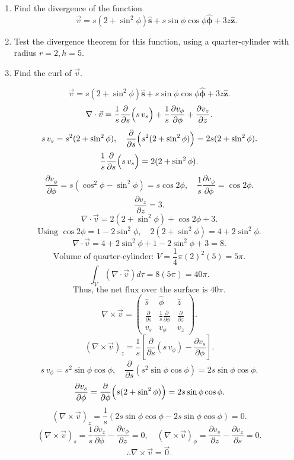 \begin{hwkProblem}{1.43}{}

	\begin{enumerate}
		\item Find the divergence of the function \[ \vec{v} = s \left( 2 + \sin^2{\phi} \right) \mathbf{\hat{s}} + s \sin{\phi} \cos{\phi} \boldsymbol{\hat{\phi}} + 3z \mathbf{\hat{z}} .\]
		\item Test the divergence theorem for this function, using a quarter-cylinder with radius \( r=2, h=5 \).
		\item Find the curl of \( \vec{v} \).
	\end{enumerate}

	\hwkSol

	\hwkPart
	\[
		\vec{v} = s \left( 2 + \sin^2{\phi} \right) \mathbf{\hat{s}} + s \sin{\phi} \cos{\phi} \boldsymbol{\hat{\phi}} + 3z \mathbf{\hat{z}}.
	\]
	\[
		\nabla\cdot\vec{v}=\frac{1}{s}\frac{\partial}{\partial s}\Bigl(s\,v_s\Bigr)
		+\frac{1}{s}\frac{\partial v_\phi}{\partial\phi}+\frac{\partial v_z}{\partial z}.
	\]
	\[
		s\,v_s=s^2(2+\sin^2\phi),\quad \frac{\partial}{\partial s}\Bigl(s^2(2+\sin^2\phi)\Bigr)=2s(2+\sin^2\phi).
	\]
	\[
		\frac{1}{s}\frac{\partial}{\partial s}\Bigl(s\,v_s\Bigr)=2(2+\sin^2\phi).
	\]
	\[
		\frac{\partial v_\phi}{\partial\phi} = s(\cos^2\phi-\sin^2\phi)=s\cos2\phi,\quad \frac{1}{s}\frac{\partial v_\phi}{\partial\phi}=\cos2\phi.
	\]
	\[
		\frac{\partial v_z}{\partial z}=3.
	\]
	\[
		\nabla\cdot\vec{v}=2(2+\sin^2\phi)+\cos2\phi+3.
	\]
	\[
		\text{Using } \cos2\phi=1-2\sin^2\phi,\quad 2(2+\sin^2\phi)=4+2\sin^2\phi.
	\]
	\[
		\nabla\cdot\vec{v}=4+2\sin^2\phi+1-2\sin^2\phi+3=8.
	\]
	\hwkPart
	\[
		\text{Volume of quarter-cylinder: } V=\frac{1}{4}\pi(2)^2(5)=5\pi.
	\]
	\[
		\int_V(\nabla\cdot\vec{v})d\tau=8(5\pi)=40\pi.
	\]
	\[
		\text{Thus, the net flux over the surface is } 40\pi.
	\]
	\hwkPart
	\[
		\nabla\times\vec{v}=
		\begin{pmatrix}
			\hat{s} & \hat{\phi} & \hat{z} \\
			\frac{\partial}{\partial s} & \frac{1}{s}\frac{\partial}{\partial\phi} & \frac{\partial}{\partial z} \\
			v_s & v_\phi & v_z
		\end{pmatrix}.
	\]
	\[
		(\nabla\times\vec{v})_z=\frac{1}{s}\left[\frac{\partial}{\partial s}(s\,v_\phi)-\frac{\partial v_s}{\partial\phi}\right].
	\]
	\[
		s\,v_\phi=s^2\sin\phi\cos\phi,\quad \frac{\partial}{\partial s}(s^2\sin\phi\cos\phi)=2s\sin\phi\cos\phi.
	\]
	\[
		\frac{\partial v_s}{\partial\phi}=\frac{\partial}{\partial\phi}\Bigl(s(2+\sin^2\phi)\Bigr)=2s\sin\phi\cos\phi.
	\]
	\[
		(\nabla\times\vec{v})_z=\frac{1}{s}(2s\sin\phi\cos\phi-2s\sin\phi\cos\phi)=0.
	\]
	\[
		(\nabla\times\vec{v})_s=\frac{1}{s}\frac{\partial v_z}{\partial\phi}-\frac{\partial v_\phi}{\partial z}=0,\quad (\nabla\times\vec{v})_\phi=\frac{\partial v_s}{\partial z}-\frac{\partial v_z}{\partial s}=0.
	\]
	\[
		\therefore \nabla\times\vec{v}=\vec{0}.
	\]
\end{hwkProblem}

